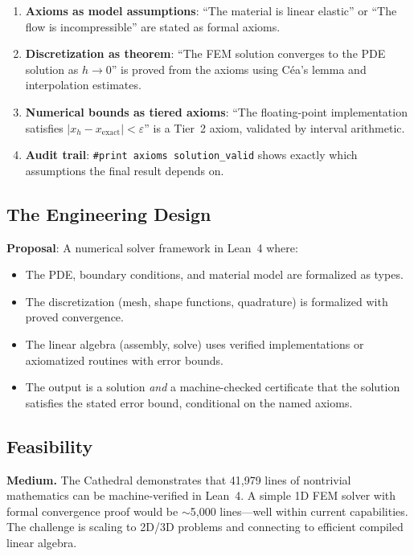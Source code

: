 \documentclass[11pt,a4paper]{article}
\begin{document}
\begin{enumerate}
  \item \textbf{Axioms as model assumptions}: ``The material is
    linear elastic'' or ``The flow is incompressible'' are stated
    as formal axioms.
  \item \textbf{Discretization as theorem}: ``The FEM solution
    converges to the PDE solution as $h \to 0$'' is proved from
    the axioms using C\'ea's lemma and interpolation estimates.
  \item \textbf{Numerical bounds as tiered axioms}: ``The
    floating-point implementation satisfies $|x_h - x_{\text{exact}}|
    < \varepsilon$'' is a Tier~2 axiom, validated by interval
    arithmetic.
  \item \textbf{Audit trail}: \texttt{\#print axioms solution\_valid}
    shows exactly which assumptions the final result depends on.
\end{enumerate}

\subsection{The Engineering Design}

\textbf{Proposal}: A numerical solver framework in Lean~4 where:
\begin{itemize}
  \item The PDE, boundary conditions, and material model are
    formalized as types.
  \item The discretization (mesh, shape functions, quadrature) is
    formalized with proved convergence.
  \item The linear algebra (assembly, solve) uses verified
    implementations or axiomatized routines with error bounds.
  \item The output is a solution \emph{and} a machine-checked
    certificate that the solution satisfies the stated error bound,
    conditional on the named axioms.
\end{itemize}

\subsection{Feasibility}

\textbf{Medium.} The Cathedral demonstrates that 41{,}979 lines of
nontrivial mathematics can be machine-verified in Lean~4. A simple
1D FEM solver with formal convergence proof would be $\sim$5,000
lines---well within current capabilities. The challenge is scaling
to 2D/3D problems and connecting to efficient compiled linear
algebra.
\end{document}
